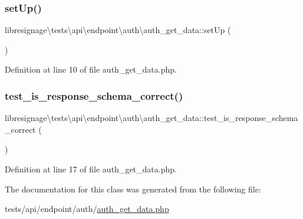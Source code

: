 \subsubsection{\texorpdfstring{set\+Up()}{setUp()}}
{\footnotesize\ttfamily libresignage\textbackslash{}tests\textbackslash{}api\textbackslash{}endpoint\textbackslash{}auth\textbackslash{}auth\+\_\+get\+\_\+data\+::set\+Up (\begin{DoxyParamCaption}{ }\end{DoxyParamCaption})}



Definition at line 10 of file auth\+\_\+get\+\_\+data.\+php.

\mbox{\label{classlibresignage_1_1tests_1_1api_1_1endpoint_1_1auth_1_1auth__get__data_acd93251e4d67a15bed2b972c08e95b8c}} 
\subsubsection{\texorpdfstring{test\+\_\+is\+\_\+response\+\_\+schema\+\_\+correct()}{test\_is\_response\_schema\_correct()}}
{\footnotesize\ttfamily libresignage\textbackslash{}tests\textbackslash{}api\textbackslash{}endpoint\textbackslash{}auth\textbackslash{}auth\+\_\+get\+\_\+data\+::test\+\_\+is\+\_\+response\+\_\+schema\+\_\+correct (\begin{DoxyParamCaption}{ }\end{DoxyParamCaption})}



Definition at line 17 of file auth\+\_\+get\+\_\+data.\+php.



The documentation for this class was generated from the following file\+:\begin{DoxyCompactItemize}
\item 
tests/api/endpoint/auth/\hyperlink{tests_2api_2endpoint_2auth_2auth__get__data_8php}{auth\+\_\+get\+\_\+data.\+php}\end{DoxyCompactItemize}

